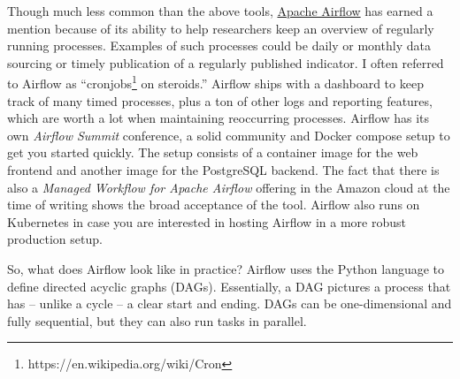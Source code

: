 \documentclass[
  12pt,
  letterpaper,
]{krantz}
\begin{document}
Though much less common than the above tools,
\href{https://airflow.apache.org/}{Apache Airflow} has earned a mention
because of its ability to help researchers keep an overview of regularly
running processes. Examples of such processes could be daily or monthly
data sourcing or timely publication of a regularly published indicator.
I often referred to Airflow as ``cronjobs\footnote{https://en.wikipedia.org/wiki/Cron}
on steroids.'' Airflow ships with a dashboard to keep track of many
timed processes, plus a ton of other logs and reporting features, which
are worth a lot when maintaining reoccurring processes. Airflow has its
own \emph{Airflow Summit} conference, a solid community and Docker
compose setup to get you started quickly. The setup consists of a
container image for the web frontend and another image for the
PostgreSQL backend. The fact that there is also a
\emph{Managed Workflow for Apache Airflow}
offering in the Amazon cloud at the time of writing shows the broad
acceptance of the tool. Airflow also runs on Kubernetes in case you are
interested in hosting Airflow in a more robust production setup.

So, what does Airflow look like in practice? Airflow uses the
Python language to define directed acyclic graphs (DAGs).
Essentially, a DAG pictures a process that has -- unlike a cycle -- a
clear start and ending. DAGs can be one-dimensional and fully
sequential, but they can also run tasks in parallel.
\end{document}

